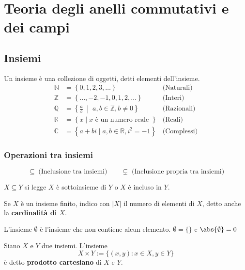 \documentclass[../main.tex]{subfiles}
\begin{document}
\chapter{Teoria degli anelli commutativi e dei campi}
\section{Insiemi}
Un insieme è una collezione di oggetti, detti elementi dell'insieme.
\begin{align*}
    \mathbb{N} & = \left\{ 0,1,2,3,\ldots \right\}                                        & \text{(Naturali)}  \\[1ex]
    \mathbb{Z} & = \left\{ \ldots,-2,-1,0,1,2,\ldots \right\}                             & \text{(Interi)}    \\[1ex]
    \mathbb{Q} & = \left\{ \frac{a}{b} \;\middle|\; a,b \in \mathbb{Z}, b \neq 0 \right\} & \text{(Razionali)} \\[1ex]
    \mathbb{R} & = \left\{ x \mid x \text{ è un numero reale }\right\}                    & \text{(Reali)}     \\[1ex]
    \mathbb{C} & = \left\{ a + bi \mid a,b \in \mathbb{R}, i^2=-1 \right\}                & \text{(Complessi)}
\end{align*}

\subsection{Operazioni tra insiemi}
\[
    \subseteq \;  \text{(Inclusione tra insiemi)} \qquad \subsetneq \; \text{(Inclusione propria tra insiemi)}
\]
\begin{note}
    $X \subseteq Y$ si legge $X$ è sottoinsieme di $Y$ o $X$ è incluso in $Y$.
\end{note}

\begin{definition}[Cardinalità]
    Se $X$ è un insieme finito, indico con $|X|$ il numero di elementi di $X$, detto anche la \textbf{cardinalità di $X$}.
\end{definition}

\begin{definition}
    L'insieme $\emptyset$ è l'insieme che non contiene alcun elemento. $\emptyset = \{ \}$ e $\abs{\emptyset} = 0$
\end{definition}

\begin{definition}
    Siano $X$ e $Y$ due insiemi. L'insieme
    \[
        X \times Y := \{ (x,y) : x \in X , y \in Y \}
    \]
    è detto \textbf{prodotto cartesiano} di $X$ e $Y$.
\end{definition}
\end{document}
